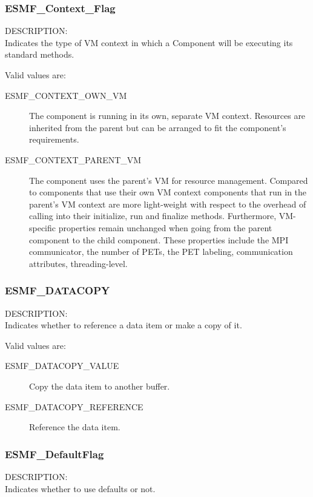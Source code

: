 \subsubsection{ESMF\_Context\_Flag}
\label{opt:contextflag}
{\sf DESCRIPTION:\\}  
Indicates the type of VM context in which a Component will be executing its
standard methods.

Valid values are:
\begin{description}

\item [ESMF\_CONTEXT\_OWN\_VM]
         The component is running in its own, separate VM context. Resources
         are inherited from the parent but can be arranged to fit the
         component's requirements.
\item [ESMF\_CONTEXT\_PARENT\_VM]
         The component uses the parent's VM for resource management. Compared
         to components that use their own VM context components that run in the
         parent's VM context are more light-weight with respect to the overhead
         of calling into their initialize, run and finalize methods.
         Furthermore, VM-specific properties remain unchanged when going from
         the parent component to the child component. These properties include
         the MPI communicator, the number of PETs, the PET labeling, 
         communication attributes, threading-level.

\end{description}

\subsubsection{ESMF\_DATACOPY}
\label{opt:datacopyflag}
{\sf DESCRIPTION:\\}
Indicates whether to reference a data item or make a copy of it.

Valid values are:
\begin{description}
\item [ESMF\_DATACOPY\_VALUE]
      Copy the data item to another buffer.
\item [ESMF\_DATACOPY\_REFERENCE]
      Reference the data item.
\end{description}

\subsubsection{ESMF\_DefaultFlag}
\label{opt:defaultflag}
{\sf DESCRIPTION:\\}
Indicates whether to use defaults or not.

